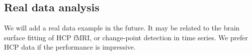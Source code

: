 \subsection{Real data analysis}

We will add a real data example in the future. It may be related to the brain surface fitting of HCP fMRI, or change-point detection in time series. We prefer HCP data if the performance is impressive.